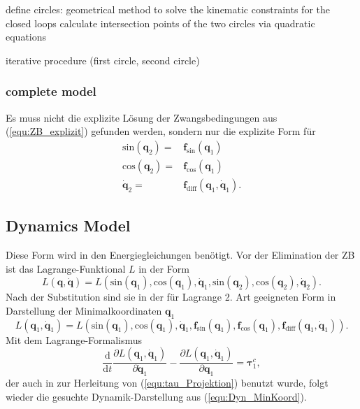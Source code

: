 \documentclass[letterpaper, 10 pt, conference]{ieeeconf}  %
\begin{document}
define circles: geometrical method to solve the kinematic constraints for the closed loops
calculate intersection points of the two circles via quadratic equations 

iterative procedure (first circle, second circle)

\subsubsection{complete model}



Es muss nicht die explizite Lösung der Zwangsbedingungen aus (\ref{equ:ZB_explizit}) gefunden werden, sondern nur die explizite Form für 
%
\begin{align}
\mathrm{sin}(\bm{q}_2) =& \bm{f}_\mathrm{sin}(\bm{q}_1) \\
\mathrm{cos}(\bm{q}_2) =& \bm{f}_\mathrm{cos}(\bm{q}_1) \\
\dot{\bm{q}}_2 =& \bm{f}_\mathrm{diff}(\bm{q}_1,\dot{\bm{q}}_1).
\end{align}


\subsection{Dynamics Model}

\label{sec:Lagrange2Elim}
%
Diese Form wird in den Energiegleichungen benötigt.
Vor der Elimination der ZB ist das Lagrange-Funktional $L$ in der Form
\begin{equation}
L(\bm{q},\dot{\bm{q}})=L(\mathrm{sin}(\bm{q}_1),\mathrm{cos}(\bm{q}_1),\dot{\bm{q}}_1,\mathrm{sin}(\bm{q}_2),\mathrm{cos}(\bm{q}_2),\dot{\bm{q}}_2).
\end{equation}
Nach der Substitution sind sie in der für Lagrange 2. Art geeigneten Form in Darstellung der Minimalkoordinaten $\bm{q}_1$
%
\begin{equation}
L(\bm{q}_1,\dot{\bm{q}}_1)=L(\mathrm{sin}(\bm{q}_1),\mathrm{cos}(\bm{q}_1),\dot{\bm{q}}_1,\bm{f}_\mathrm{sin}(\bm{q}_1),\bm{f}_\mathrm{cos}(\bm{q}_1), \bm{f}_\mathrm{diff}(\bm{q}_1,\dot{\bm{q}}_1)).
\end{equation}
%
Mit dem Lagrange-Formalismus
%
\begin{equation}
\frac{\mathrm{d}}{\mathrm{d}t}\frac{\partial L(\bm{q}_1,\dot{\bm{q}}_1)}{\partial \dot{\bm{q}}_1} - \frac{\partial L(\bm{q}_1,\dot{\bm{q}}_1)}{\partial \bm{q}_1} = \bm{\tau}^c_1,
\end{equation}
%
der auch in \cite{NakamuraGho1989} zur Herleitung von (\ref{equ:tau_Projektion}) benutzt wurde, folgt wieder die gesuchte Dynamik-Darstellung aus (\ref{equ:Dyn_MinKoord}).
\end{document}
